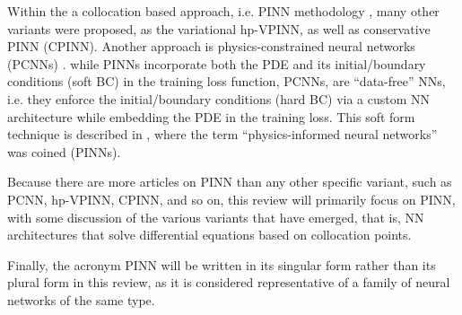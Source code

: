 \documentclass[pdflatex,sn-basic]{sn-jnl}%
\theoremstyle{thmstyleone}%
\theoremstyle{thmstyletwo}%
\theoremstyle{thmstylethree}%
\begin{document}

Within the a collocation based approach, i.e. PINN methodology  \citep{Rai2019_PhysicsInformedNeural_PerRPK, Yan2019_AdversarialUncertaintyQuantification_PerYP, Men2020_PpinnPararealPhysics_LiMLZK}, many other variants were proposed, as  the variational hp-VPINN, as well as conservative PINN (CPINN)\citep{Jag2020_ConservativePhysicsInformed_KhaJKK}.
Another approach is  physics-constrained neural networks (PCNNs) \citep{Zhu2019_PhysicsConstrainedDeep_ZabZZKP, Sun2020_SurrogateModelingFluid_GaoSGPW, Liu2021_DualDimerMethod_WanLW}.
while PINNs incorporate both the PDE and its initial/boundary conditions (soft BC) in the training loss function, PCNNs, are ``data-free'' NNs, i.e. they enforce the initial/boundary conditions (hard BC) via a custom NN architecture while embedding the PDE in the training loss. 
This soft form technique is described in  \cite{Rai2019_PhysicsInformedNeural_PerRPK}, where the term ``physics-informed neural networks'' was coined (PINNs).
%

Because there are more articles on PINN than any other specific variant, such as PCNN, hp-VPINN, CPINN, and so on, this review will primarily focus on PINN, with some discussion of the various variants that have emerged, that is, NN architectures that solve differential equations based on collocation points. 

Finally, the acronym PINN will be written in its singular form rather than its plural form in this review, as it is considered representative of a family of neural networks of the same type. 
\end{document}
